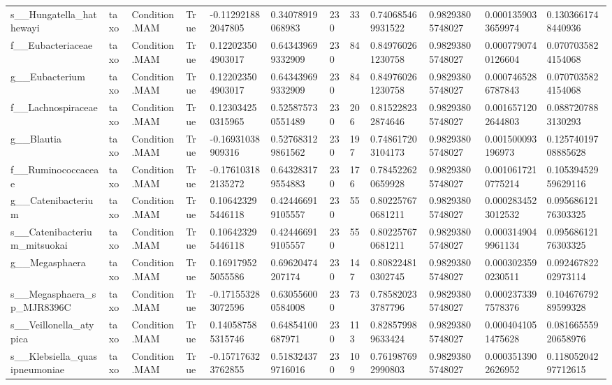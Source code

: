 \begin{longtable}{llllllllllll}
s\_\_Hungatella\_hathewayi & taxo & Condition.MAM & True & -0.112921882047805 & 0.34078919068983 & 230 & 33 & 0.740685469931522 & 0.98293805748027 & 0.0001359033659974 & 0.1303661748440936 \\
f\_\_Eubacteriaceae & taxo & Condition.MAM & True & 0.122023504903017 & 0.643439699332909 & 230 & 84 & 0.849760261230758 & 0.98293805748027 & 0.0007790740126604 & 0.0707035824154068 \\
g\_\_Eubacterium & taxo & Condition.MAM & True & 0.122023504903017 & 0.643439699332909 & 230 & 84 & 0.849760261230758 & 0.98293805748027 & 0.0007465286787843 & 0.0707035824154068 \\
f\_\_Lachnospiraceae & taxo & Condition.MAM & True & 0.123034250315965 & 0.525875730551489 & 230 & 206 & 0.815228232874646 & 0.98293805748027 & 0.0016571202644803 & 0.0887207883130293 \\
g\_\_Blautia & taxo & Condition.MAM & True & -0.16931038909316 & 0.527683129861562 & 230 & 197 & 0.748617203104173 & 0.98293805748027 & 0.001500093196973 & 0.12574019708885628 \\
f\_\_Ruminococcaceae & taxo & Condition.MAM & True & -0.176103182135272 & 0.643283179554883 & 230 & 176 & 0.784522620659928 & 0.98293805748027 & 0.0010617210775214 & 0.10539452959629116 \\
g\_\_Catenibacterium & taxo & Condition.MAM & True & 0.106423295446118 & 0.424466919105557 & 230 & 55 & 0.802257670681211 & 0.98293805748027 & 0.0002834523012532 & 0.09568612176303325 \\
s\_\_Catenibacterium\_mitsuokai & taxo & Condition.MAM & True & 0.106423295446118 & 0.424466919105557 & 230 & 55 & 0.802257670681211 & 0.98293805748027 & 0.0003149049961134 & 0.09568612176303325 \\
g\_\_Megasphaera & taxo & Condition.MAM & True & 0.169179525055586 & 0.69620474207174 & 230 & 147 & 0.808224810302745 & 0.98293805748027 & 0.0003023590230511 & 0.09246782202973114 \\
s\_\_Megasphaera\_sp\_MJR8396C & taxo & Condition.MAM & True & -0.171553283072596 & 0.630556000584008 & 230 & 73 & 0.785820233787796 & 0.98293805748027 & 0.0002373397578376 & 0.10467679289599328 \\
s\_\_Veillonella\_atypica & taxo & Condition.MAM & True & 0.140587585315746 & 0.64854100687971 & 230 & 113 & 0.828579989633424 & 0.98293805748027 & 0.0004041051475628 & 0.08166555920658976 \\
s\_\_Klebsiella\_quasipneumoniae & taxo & Condition.MAM & True & -0.157176323762855 & 0.518324379716016 & 230 & 109 & 0.761987692990803 & 0.98293805748027 & 0.0003513902626952 & 0.11805204297712615 \\

\end{longtable}
